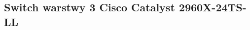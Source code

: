 \documentclass[a4paper,12pt]{extarticle}  %
\begin{document}
\subsection{Switch warstwy 3 Cisco Catalyst 2960X-24TS-LL}
\begin{figure}[H]
	\centering
\end{figure}
\end{document}
